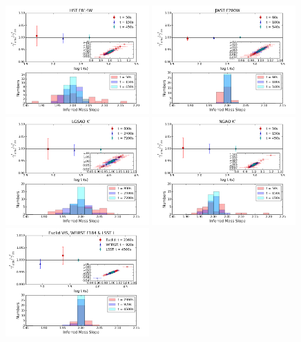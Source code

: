 \documentclass[a4paper,11pt]{article}
\begin{document}
{%
\begin{figure}
\begin{center}
\includegraphics[width=0.49\textwidth]{figures/gamma_hist_0330anti_4QSO_HST.png}
\includegraphics[width=0.49\textwidth]{figures/gamma_hist_0330anti_4QSO_JWST.png} \\
\includegraphics[width=0.49\textwidth]{figures/gamma_hist_0330anti_4QSO_Keck.png}
\includegraphics[width=0.49\textwidth]{figures/gamma_hist_0330anti_4QSO_NGAO.png} \\
\includegraphics[width=0.49\textwidth]{figures/gamma_hist_0330anti_4QSO_EWL.png}

\end{center}
\end{figure}}
\end{document}
